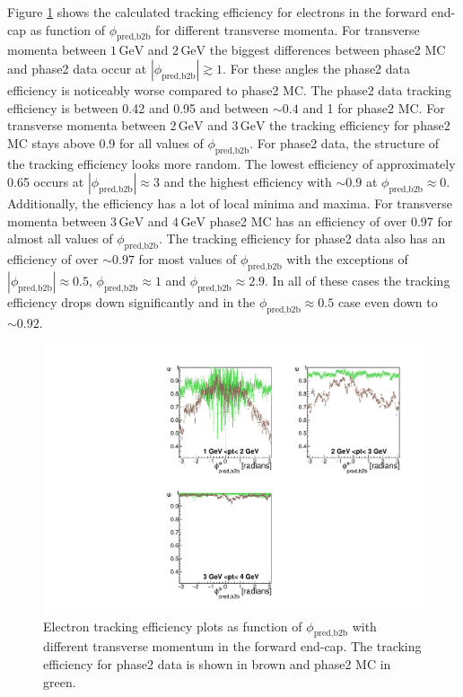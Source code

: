 \documentclass[a4paper,11pt,twosided,final,german,openbib,pdftex,listof=totoc,bibliography=totoc]{scrbook}
\begin{document}
Figure \ref{plt:xPtMPhiemFC} shows the calculated tracking efficiency for electrons in the forward end-cap as function of $\phi_{\textrm{pred,b2b}}$ for different transverse momenta. 
For transverse momenta between $1\,\textrm{GeV}$ and $2\,\textrm{GeV}$ the biggest differences between phase2 MC and phase2 data occur at $|\phi_{\textrm{pred,b2b}}| \gtrsim 1$. For these angles the phase2 data efficiency is noticeably worse compared to phase2 MC. The phase2 data tracking efficiency is between 0.42 and 0.95 and between $\sim 0.4$ and 1 for phase2 MC. 
For transverse momenta between $2\,\textrm{GeV}$ and $3\,\textrm{GeV}$ the tracking efficiency for phase2 MC stays above 0.9 for all values of $\phi_{\textrm{pred,b2b}}$. For phase2 data, the structure of the tracking efficiency looks more random. The lowest efficiency of approximately 0.65 occurs at $|\phi_{\textrm{pred,b2b}}| \approx 3$ and the highest efficiency with $\sim 0.9$ at $\phi_{\textrm{pred,b2b}} \approx 0$. Additionally, the efficiency has a lot of local minima and maxima. 
For transverse momenta between $3\,\textrm{GeV}$ and $4\,\textrm{GeV}$ phase2 MC has an efficiency of over 0.97 for almost all values of $\phi_{\textrm{pred,b2b}}$. The tracking efficiency for phase2 data also has an efficiency of over $\sim 0.97$ for most values of $\phi_{\textrm{pred,b2b}}$ with the exceptions of $|\phi_{\textrm{pred,b2b}}| \approx 0.5$, $\phi_{\textrm{pred,b2b}}  \approx 1$ and $\phi_{\textrm{pred,b2b}} \approx 2.9$. In all of these cases the tracking efficiency drops down significantly and in the $\phi_{\textrm{pred,b2b}} \approx 0.5$ case even down to $\sim 0.92$.

\begin{figure}[!htbp]
	\centering
	\includegraphics[width=\textwidth]{Plots/master/xPtMPhiemFC}
	\caption[Transverse Momentum $\phi_{\textrm{pred,b2b}}$ Electron Forward End-Cap Efficiency Phase2]{Electron tracking efficiency plots as function of $\phi_{\textrm{pred,b2b}}$ with different transverse momentum in the forward end-cap. The tracking efficiency for phase2 data is shown in brown and phase2 MC in green.
		\label{plt:xPtMPhiemFC}}
\end{figure}
\end{document}
